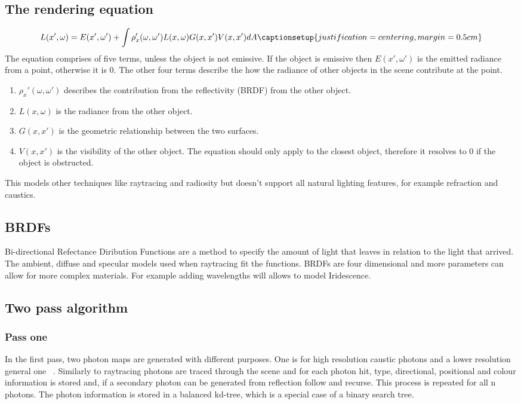 \documentclass{article}
\begin{document}
\subsection{The rendering equation}
\begin{equation}
L(x',\omega) = E(x',\omega') + \int\rho_x'( \omega,\omega') L(x,\omega)G(x,x')V(x,x') dA
\captionsetup{justification=centering,margin=0.5cm}
\label{equ:fresnelrpar}
\end{equation}
The equation comprises of five terms, unless the object is not emissive. If the object is emissive then $ E(x',\omega') $ is the emitted radiance from a point, otherwise it is 0. The other four terms describe the how the radiance of other objects in the scene contribute at the point.

\begin{enumerate}
\item $ \rho_x'( \omega,\omega') $ describes the contribution from the reflectivity (BRDF) from the other object. 
\item $ L(x,\omega) $ is the radiance from the other object.
\item $ G(x,x') $ is the geometric relationship between the two surfaces.
\item $ V(x,x') $ is the visibility of the other object. The equation should only apply to the closest object, therefore it resolves to 0 if the object is obstructed.
\end{enumerate}

This models other techniques like raytracing and radiosity but doesn't support all natural lighting features, for example refraction and caustics.

\subsection{BRDFs}
Bi-directional Refectance Diribution Functions are a method to specify the amount of light that leaves in relation to the light that arrived. The ambient, diffuse and specular models used when raytracing fit the functions. BRDFs are four dimensional and more parameters can allow for more complex materials. For example adding wavelengths will allows to model Iridescence. 

\subsection{Two pass algorithm}
\subsubsection{Pass one}
In the first pass, two photon maps are generated with different purposes. One is for high resolution caustic photons and a lower resolution general one ~\cite{ref:lec12}. Similarly to raytracing photons are traced through the scene and for each photon hit, type, directional, positional and colour information is stored and, if a secondary photon can be generated from reflection follow and recurse. This process is repeated for all n photons. The photon information is stored in a balanced kd-tree, which is a special case of a binary search tree.
\end{document}
